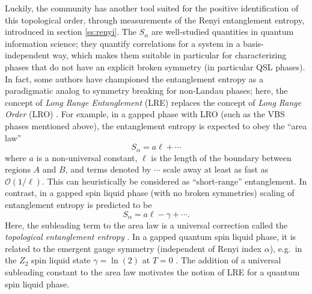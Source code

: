 \documentclass[range]{ar2e}
\begin{document}
Luckily, the community has another tool suited for the positive identification of this topological order, through measurements of the Renyi entanglement entropy, introduced in section \ref{ss:renyi}.  The $S_{\alpha}$ are well-studied quantities in quantum information science; they quantify correlations for a system in a basis-independent way, which makes them suitable in particular for characterizing phases that do not have an explicit broken symmetry (in particular QSL phases).  In fact, some authors have championed the entanglement entropy as a paradigmatic analog to symmetry breaking for non-Landau phases; here, the concept of {\it Long Range Entanglement} (LRE) replaces the concept of {\it Long Range Order} (LRO) \cite{Wenbook}.  For example, in a gapped phase with LRO (such as the VBS phases mentioned above),
the entanglement entropy is expected to obey the ``area law''
\begin{equation} 
S_{\alpha} = a\ell + \cdots
\end{equation}
where $a$ is a non-universal constant, $\ell$ is the length of the boundary between regions $A$ and $B$, and terms denoted by $\cdots$ scale away at least as fast as $\mathcal{O} (1/\ell)$.  This can heuristically be considered as ``short-range'' entanglement.  In contrast, in a gapped spin liquid phase (with no broken symmetries)
scaling of entanglement entropy is predicted to be
\begin{equation}
S_{\alpha} = a \ell - \gamma + \cdots \label{areaL}.
\end{equation}
 Here, the subleading term to the area law is a universal correction called the {\it topological entanglement entropy} \cite{Alioscia1,Alioscia2,LW,KP}.  In a gapped quantum spin liquid phase, it is related to the emergent gauge symmetry (independent \cite{Flammia} of Renyi index $\alpha$), e.g.~in the $Z_2$ spin liquid state $\gamma =  \ln(2)$ at $T=0$ \cite{LW}.   The addition of a universal subleading constant to the area law motivates the notion of LRE for a quantum spin liquid phase.
\end{document}
